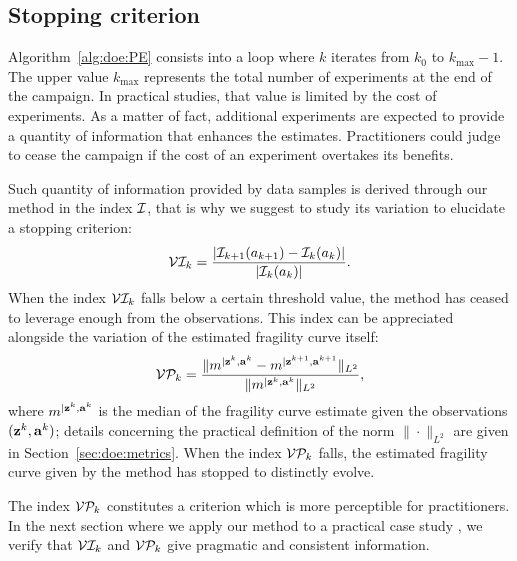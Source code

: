 

\subsection{{Stopping} criterion \label{sec:doe:stopping_crit}}

Algorithm~\ref{alg:doe:PE} consists into a loop where $k$ iterates from $k_0$ to $k_{\max}-1$. The upper value $k_{\max}$ represents the total number of experiments at the end of the campaign. 
In practical studies, that value is limited by the cost of experiments.
%
As a matter of fact, additional experiments are expected to provide a quantity of information that enhances the estimates. %
Practitioners could judge to cease the campaign if the cost of an experiment overtakes its benefits.

Such quantity of information provided by data samples is derived through our method in the index $\mathcal{I}$, that is why we suggest to study its variation to elucidate a {stopping} criterion:
\begin{equation}
    \mathcal{V}\mathcal{I}_k = \frac{|\mathcal{I}_{k+1}(a_{k+1})-\mathcal{I}_k(a_k)|}{|\mathcal{I}_k(a_k)|}.
\end{equation}
When the index $\mathcal{V}\mathcal{I}_k$ falls below a certain threshold value, the method has ceased to leverage enough from the observations.
This index can be appreciated alongside the variation of the estimated fragility curve itself:
    \begin{equation}
            \mathcal{V}\mathcal{P}_k = \frac{\|m^{|\mathbf{z}^k,\mathbf{a}^k} - m^{|\mathbf{z}^{k+1},\mathbf{a}^{k+1}}\|_{L^2}}{\|m^{|\mathbf{z}^k,\mathbf{a}^k}\|_{L^2}},
    \end{equation}
where $m^{|\mathbf{z}^k,\mathbf{a}^k}$ is the median of the fragility curve estimate given the observations $(\mathbf{z}^k,\mathbf{a}^k)$; details concerning the practical definition of the norm $\|\cdot\|_{L^2}$ are given in Section~\ref{sec:doe:metrics}.
When the index $\mathcal{V}\mathcal{P}_k $ falls, the estimated fragility curve given by the method has stopped to distinctly evolve.

The index $\mathcal{V}\mathcal{P}_k$ constitutes a criterion which is more perceptible {for practitioners}.
In the next section where we apply our method to a practical case study ,{ we verify that $\mathcal{V}\mathcal{I}_k$ and $\mathcal{V}\mathcal{P}_k$ give pragmatic and consistent information.}

